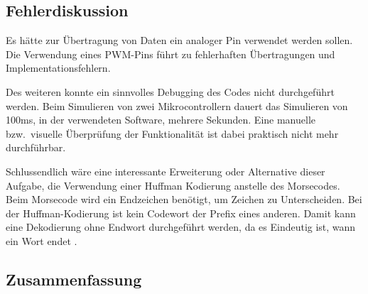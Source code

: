\subsection{Fehlerdiskussion}
\label{subsec:a7-fehlerdiskussion}

Es hätte zur Übertragung von Daten ein analoger Pin verwendet werden sollen.
Die Verwendung eines PWM-Pins führt zu fehlerhaften Übertragungen und Implementationsfehlern.

Des weiteren konnte ein sinnvolles Debugging des Codes nicht durchgeführt werden.
Beim Simulieren von zwei Mikrocontrollern dauert das Simulieren von 100ms, in der verwendeten Software, mehrere Sekunden.
Eine manuelle bzw.\ visuelle Überprüfung der Funktionalität ist dabei praktisch nicht mehr durchführbar.

Schlussendlich wäre eine interessante Erweiterung oder Alternative dieser Aufgabe, die Verwendung einer Huffman Kodierung anstelle des Morsecodes.
Beim Morsecode wird ein Endzeichen benötigt, um Zeichen zu Unterscheiden.
Bei der Huffman-Kodierung ist kein Codewort der Prefix eines anderen.
Damit kann eine Dekodierung ohne Endwort durchgeführt werden, da es Eindeutig ist, wann ein Wort endet \cite{huffman}.

\subsection{Zusammenfassung}
\label{subsec:a7-zusammenfassung}
